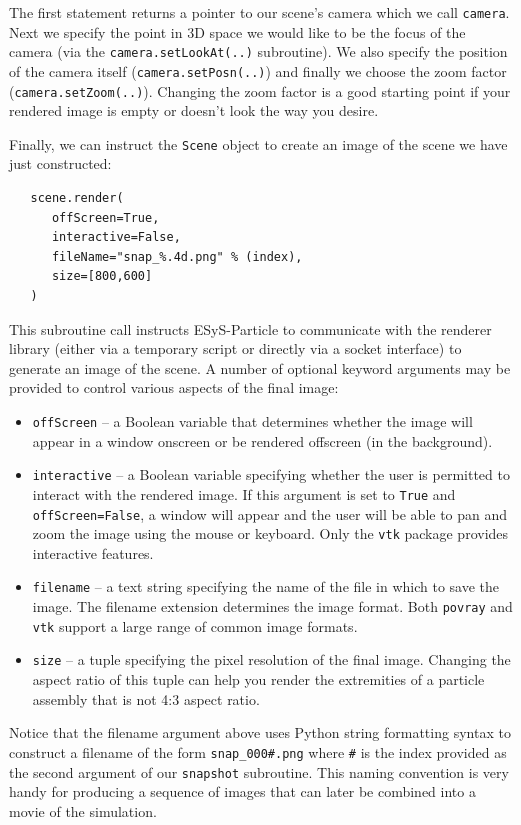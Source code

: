 \noindent
The first statement returns a pointer to our scene's camera which we call \texttt{camera}. Next we specify the point in 3D space we would like to be the focus of the camera (via the \texttt{camera.setLookAt(..)} subroutine). We also specify the position of the camera itself (\texttt{camera.setPosn(..)}) and finally we choose the zoom factor (\texttt{camera.setZoom(..)}). Changing the zoom factor is a good starting point if your rendered image is empty or doesn't look the way you desire.

Finally, we can instruct the \texttt{Scene} object to create an image of the scene we have just constructed:

\begin{verbatim}
   scene.render(
      offScreen=True,
      interactive=False,
      fileName="snap_%.4d.png" % (index),
      size=[800,600]
   )
\end{verbatim}

\noindent
This subroutine call instructs ESyS-Particle to communicate with the renderer library (either via a temporary script or directly via a socket interface) to generate an image of the scene. A number of optional keyword arguments may be provided to control various aspects of the final image:
\begin{itemize}
\item \texttt{offScreen} -- a Boolean variable that determines whether the image will appear in a window onscreen or be rendered offscreen (in the background). 
\item \texttt{interactive} -- a Boolean variable specifying whether the user is permitted to interact with the rendered image. If this argument is set to \texttt{True} and \texttt{offScreen=False}, a window will appear and the user will be able to pan and zoom the image using the mouse or keyboard. Only the \texttt{vtk} package provides interactive features.
\item \texttt{filename} -- a text string specifying the name of the file in which to save the image. The filename extension determines the image format. Both \texttt{povray} and \texttt{vtk} support a large range of common image formats. 
\item \texttt{size} -- a tuple specifying the pixel resolution of the final image. Changing the aspect ratio of this tuple can help you render the extremities of a particle assembly that is not 4:3 aspect ratio.
\end{itemize}

\noindent
Notice that the filename argument above uses Python string formatting syntax to construct a filename of the form \texttt{snap\_000\#.png} where \texttt{\#} is the index provided as the second argument of our \texttt{snapshot} subroutine. This naming convention is very handy for producing a sequence of images that can later be combined into a movie of the simulation.

